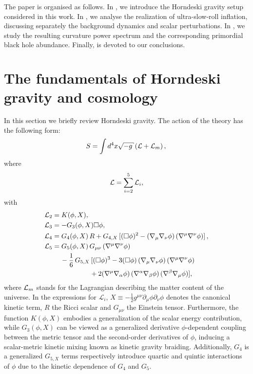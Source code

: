 \documentclass[nofootinbib,aps,a4paper,letterpaper,superscriptaddress,
twocolumn,times]{revtex4}
\renewcommand{\(}{\left(}
\renewcommand{\)}{\right)}
\renewcommand{\(}{\left(}
\renewcommand{\)}{\right)}
\renewcommand{\[}{\left[}
\renewcommand{\]}{\right]}
\begin{document}
The paper is organised as follows. In , we introduce the 
Horndeski gravity setup considered in this work. In , we 
analyse the realization of ultra-slow-roll inflation, discussing separately the 
background dynamics and scalar perturbations. In , we study the 
resulting curvature power spectrum and the corresponding primordial black hole 
abundance. Finally,  is devoted to our conclusions.



 

 \section{The fundamentals of Horndeski gravity and 
cosmology}\label{sec:Horndeski}


In this section we briefly review  Horndeski gravity. The action of the theory has the following form: \cite{Horndeski:1974wa, 
Deffayet:2011gz, Kobayashi:2011nu}
\begin{equation}
S=\int d^{4}x\sqrt{-g}\left({\cal L}+{\cal L}_m\right),\,\label{action1}
\end{equation}
where
\begin{equation}
{\cal L}=\sum_{i=2}^{5}{\cal L}_{i},\label{Lagsum}
\end{equation}
 with
\begin{align}
&{\cal L}_{2} = K(\phi,X),\label{eachlag2}\\
&{\cal L}_{3} = -G_{3}(\phi,X)\Box\phi,\\
&{\cal L}_{4} = G_{4}(\phi,X)\,
R+G_{4,X}\,[(\Box\phi)^{2}-(\nabla_{\mu}\nabla_{\nu}\phi)\,(\nabla^{\mu}
\nabla^{\nu}\phi)]\,,\\
&{\cal L}_{5} = G_{5}(\phi,X)\,
G_{\mu\nu}\,(\nabla^{\mu}\nabla^{\nu}\phi)\,\nonumber\\&\ \ \
\ \ \ \ -\frac{1}{6}\,
G_{5,X}\,[(\Box\phi)^{3}-3(\Box\phi)\,(\nabla_{\mu}\nabla_{\nu}\phi)\,
(\nabla^{\mu}\nabla^{\nu}\phi)
\,\nonumber\\&\ \ \
\ \ \ \ \ \ \ \ \ \ \ \ \ \ \ \ \ 
+2(\nabla^{\mu}\nabla_{\alpha}\phi)\,(\nabla^
{\alpha}\nabla_{\beta}\phi)\,(\nabla^{\beta}\nabla_{\mu}\phi)],\,\label{eachlag5
}
\end{align}
where ${\cal L}_m$ stands for the Lagrangian describing the matter content of 
the universe. In the expressions for $\mathcal{L}_i$,  $X \equiv -\frac{1}{2} 
g^{\mu\nu} \partial_\mu \phi \partial_\nu \phi$ denotes the canonical kinetic 
term, $R$ the Ricci scalar and $G_{\mu\nu}$ the Einstein tensor. 
Furthermore, the function $K(\phi,X)$ embodies a generalization of the scalar 
energy contribution, while $G_3(\phi,X)$ can be viewed as a generalized 
derivative $\phi$-dependent coupling between the metric tensor and the 
second-order derivatives of $\phi$, inducing a scalar-metric kinetic mixing 
known as kinetic gravity braiding. Additionally, $G_{4}$ is a generalized 
$G_{5,X}$ terms respectively introduce  quartic and  quintic interactions of 
$\phi$ due to the kinetic dependence of $G_4$ and $G_5$. 
\end{document}
